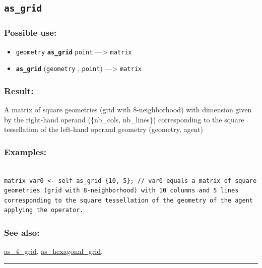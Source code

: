 \documentclass[]{book}
\providecommand{\tightlist}{%
  \setlength{\itemsep}{0pt}\setlength{\parskip}{0pt}}
\theoremstyle{definition}
\theoremstyle{definition}
\theoremstyle{definition}
\theoremstyle{remark}
\begin{document}
\subsection{\texorpdfstring{\texttt{as\_grid}}{as\_grid}}\label{as_grid}

\subsubsection{Possible use:}\label{possible-use-48}

\begin{itemize}
\tightlist
\item
  \texttt{geometry} \textbf{\texttt{as\_grid}} \texttt{point}
  ---\textgreater{} \texttt{matrix}
\item
  \textbf{\texttt{as\_grid}} (\texttt{geometry} , \texttt{point})
  ---\textgreater{} \texttt{matrix}
\end{itemize}

\subsubsection{Result:}\label{result-47}

A matrix of square geometries (grid with 8-neighborhood) with dimension
given by the right-hand operand (\{nb\_cols, nb\_lines\}) corresponding
to the square tessellation of the left-hand operand geometry (geometry,
agent)

\subsubsection{Examples:}\label{examples-39}

\begin{verbatim}
 
matrix var0 <- self as_grid {10, 5}; // var0 equals a matrix of square geometries (grid with 8-neighborhood) with 10 columns and 5 lines corresponding to the square tessellation of the geometry of the agent applying the operator.
\end{verbatim}

\subsubsection{See also:}\label{see-also-33}

\href{operators-a-to-a.html\#as_4_grid}{as\_4\_grid},
\href{operators-a-to-a.html\#as_hexagonal_grid}{as\_hexagonal\_grid},

\begin{center}\rule{0.5\linewidth}{\linethickness}\end{center}
\end{document}
